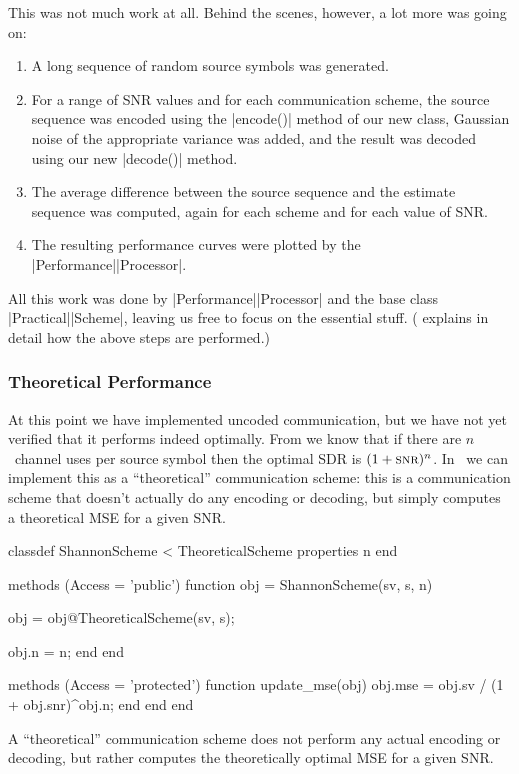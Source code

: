 This was not much work at all. Behind the scenes, however, a lot more was going
on:
\begin{enumerate}
  \item A long sequence of random source symbols was generated.
  \item For a range of SNR values and for each communication scheme, the source
    sequence was encoded using the |encode()| method of our new class,
    Gaussian noise of the appropriate variance was added, and the result was
    decoded using our new |decode()| method.
  \item The average difference between the source sequence and the estimate
    sequence was computed, again for each scheme and for each value of SNR. 
  \item The resulting performance curves were plotted by the
    |Performance|\-|Processor|.
\end{enumerate}
All this work was done by |Performance|\-|Processor| and the base class
|Practical|\-|Scheme|, leaving us free to focus on the essential stuff.
( explains in detail how the above steps are performed.)


\subsubsection{Theoretical Performance}

At this point we have implemented uncoded communication, but we have not
yet verified that it performs indeed optimally. From  we know
that if there are $n$~channel uses per source symbol then the optimal SDR
is $(1 + \snr)^n$. In \jscsim\ we can implement this as a ``theoretical''
communication scheme: this is a communication scheme that doesn't actually do
any encoding or decoding, but simply computes a theoretical MSE for a 
given SNR.

\begin{listing}
\begin{Code}
  classdef ShannonScheme < TheoreticalScheme
    properties
      n         %
    end

    methods (Access = 'public')
      function obj = ShannonScheme(sv, s, n)
        
        obj = obj@TheoreticalScheme(sv, s);

        obj.n = n;
      end
    end

    methods (Access = 'protected')
      function update_mse(obj)
          obj.mse = obj.sv / (1 + obj.snr)^obj.n;
      end
    end
  end
\end{Code}
  \caption{A ``theoretical'' communication scheme does not perform any
  actual encoding or decoding, but rather computes the theoretically optimal MSE
  for a given SNR.}
  \label{lst:shannonscheme}
\end{listing}

